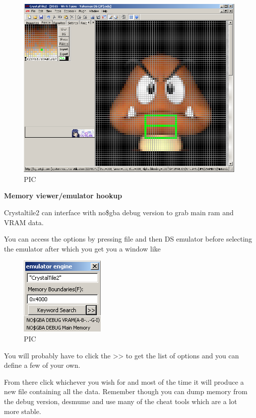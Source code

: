 \documentclass[
]{book}
\begin{document}
\begin{figure}
\centering
\includegraphics{images/225_home_fast6191_romhackingguide_unrenamed_fil___inal_borders_romhackguidecrystaltile2usage6.png}
\caption{PIC}
\end{figure}

\textbf{Memory viewer/emulator hookup}

Crystaltile2 can interface with no\$gba debug version to grab main ram and VRAM data.

You can access the options by pressing file and then DS emulator before selecting the emulator after which you get you a window like

\begin{figure}
\centering
\includegraphics{images/226_home_fast6191_romhackingguide_unrenamed_fil___inal_borders_romhackguidecrystaltile2usage7.png}
\caption{PIC}
\end{figure}

You will probably have to click the \textgreater﻿\textgreater{} to get the list of options and you can define a few of your own.

From there click whichever you wish for and most of the time it will produce a new file containing all the data. Remember though you can dump memory from the debug version, desmume and use many of the cheat tools which are a lot more stable.
\end{document}
